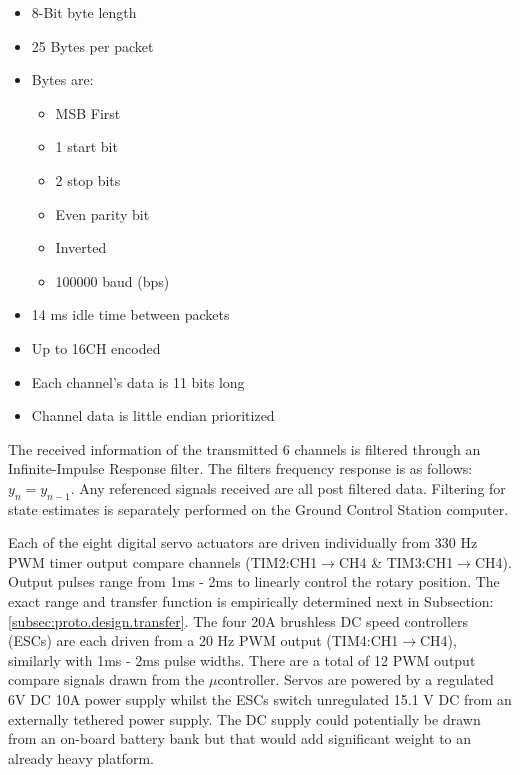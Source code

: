\vspace{-15pt}
\begin{itemize}[itemsep=0em]
\item 8-Bit byte length
\item 25 Bytes per packet
\item Bytes are:
\vspace{-5pt}
\begin{itemize}[itemsep=0em]
\item MSB First
\item 1 start bit
\item 2 stop bits
\item Even parity bit
\item Inverted
\item 100000 baud (bps)
\end{itemize}
\vspace{-5pt}
\item 14 ms idle time between packets
\item Up to 16CH encoded
\item Each channel's data is 11 bits long
\item Channel data is little endian prioritized
\end{itemize}
{\color{red}
The received information of the transmitted 6 channels is filtered through an Infinite-Impulse Response filter. The filters frequency response is as follows: $
y_n = y_{n-1}$. Any referenced signals received are all post filtered data. Filtering for state estimates is separately performed on the Ground Control Station computer.}
\par
Each of the eight digital servo actuators are driven individually from 330 Hz PWM timer output compare channels (TIM2:CH1$\rightarrow$CH4 \& TIM3:CH1$\rightarrow$CH4). Output pulses range from 1ms - 2ms to linearly control the rotary position. The exact range and transfer function is empirically determined next in Subsection:\ref{subsec:proto.design.transfer}. The four 20A brushless DC speed controllers (ESCs) are each driven from a 20 Hz PWM output (TIM4:CH1$\rightarrow$CH4), similarly with 1ms - 2ms pulse widths. There are a total of 12 PWM output compare signals drawn from the $\mu$controller. Servos are powered by a regulated 6V DC 10A power supply \cite{rotorstar} whilst the ESCs switch unregulated 15.1 V DC from an externally tethered power supply. The DC supply could potentially be drawn from an on-board battery bank but that would add significant weight to an already heavy platform.
\par
